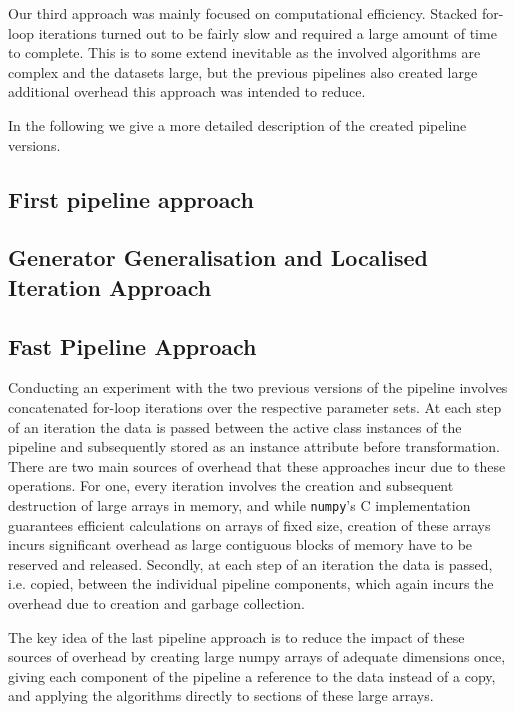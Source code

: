 Our third approach was mainly focused on computational efficiency. 
Stacked for-loop iterations turned out to be fairly slow and required a large amount of time to complete.
This is to some extend inevitable as the involved algorithms are complex and the datasets large, 
but the previous pipelines also created large additional overhead this approach was intended to reduce.

In the following we give a more detailed description of the created pipeline versions.

\subsection{First pipeline approach}



\subsection{Generator Generalisation and Localised Iteration Approach}



\subsection{Fast Pipeline Approach}

Conducting an experiment with the two previous versions of the pipeline involves concatenated for-loop iterations over the respective parameter sets.
At each step of an iteration the data is passed between the active class instances of the pipeline and subsequently stored as an instance attribute before transformation.
There are two main sources of overhead that these approaches incur due to these operations.
For one, every iteration involves the creation and subsequent destruction of large arrays in memory, 
and while \texttt{numpy}'s C implementation guarantees efficient calculations on arrays of fixed size, 
creation of these arrays incurs significant overhead as large contiguous blocks of memory have to be reserved and released.
Secondly, at each step of an iteration the data is passed, i.e. copied, 
between the individual pipeline components, which again incurs the overhead due to creation and garbage collection.

The key idea of the last pipeline approach is to reduce the impact of these sources of overhead by creating large numpy arrays of adequate dimensions once,
giving each component of the pipeline a reference to the data instead of a copy, and applying the algorithms directly to sections of these large arrays.

